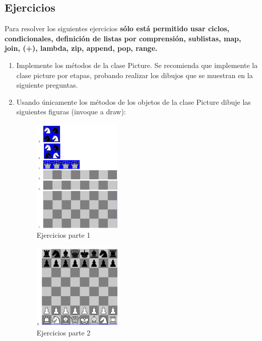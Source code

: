 \documentclass{article}
\begin{document}
  
  \subsection{Ejercicios}
  Para resolver los siguientes ejercicios \textbf{sólo está permitido usar ciclos, condicionales, definición de listas por comprensión, sublistas, 
  map, join, (+), lambda, zip, append, pop, range.}
  \begin{enumerate}
    \item Implemente los métodos de la clase Picture. Se recomienda que implemente la clase picture por etapas, probando realizar los dibujos que se 
    muestran en la siguiente preguntas.
    \item Usando únicamente los métodos de los objetos de la clase Picture dibuje las siguientes figuras (invoque a draw):
    \begin{figure}[H]
      \centering
      \includegraphics[width=0.4\textwidth, keepaspectratio]{img/ejerciciosP.png}
      \caption{Ejercicios parte 1}
    \end{figure}
    \begin{figure}[H]
      \centering
      \includegraphics[width=0.4\textwidth, keepaspectratio]{img/ejerciciosP2.png}
      \caption{Ejercicios parte 2}
    \end{figure}
  \end{enumerate}
  \newpage
  
\end{document}
